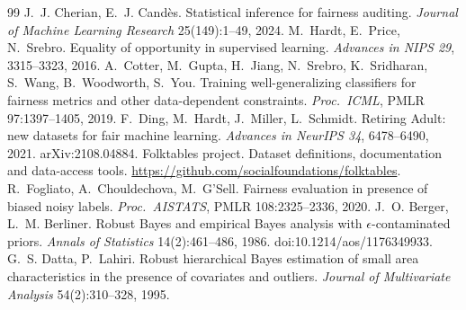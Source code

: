 \begin{thebibliography}{99}
 J.~J. Cherian, E.~J. Cand\`es. Statistical inference for fairness auditing. \emph{Journal of Machine Learning Research} 25(149):1--49, 2024.
 M.~Hardt, E.~Price, N.~Srebro. Equality of opportunity in supervised learning. \emph{Advances in NIPS 29}, 3315--3323, 2016.
 A.~Cotter, M.~Gupta, H.~Jiang, N.~Srebro, K.~Sridharan, S.~Wang, B.~Woodworth, S.~You. Training well-generalizing classifiers for fairness metrics and other data-dependent constraints. \emph{Proc.\ ICML}, PMLR 97:1397--1405, 2019.
 F.~Ding, M.~Hardt, J.~Miller, L.~Schmidt. Retiring Adult: new datasets for fair machine learning. \emph{Advances in NeurIPS 34}, 6478--6490, 2021. arXiv:2108.04884.
 Folktables project. Dataset definitions, documentation and data-access tools. \url{https://github.com/socialfoundations/folktables}.
 R.~Fogliato, A.~Chouldechova, M.~G'Sell. Fairness evaluation in presence of biased noisy labels. \emph{Proc.\ AISTATS}, PMLR 108:2325--2336, 2020.
 J.~O. Berger, L.~M. Berliner. Robust Bayes and empirical Bayes analysis with $\epsilon$-contaminated priors. \emph{Annals of Statistics} 14(2):461--486, 1986. doi:10.1214/aos/1176349933.
 G.~S. Datta, P.~Lahiri. Robust hierarchical Bayes estimation of small area characteristics in the presence of covariates and outliers. \emph{Journal of Multivariate Analysis} 54(2):310--328, 1995.
\end{thebibliography}
